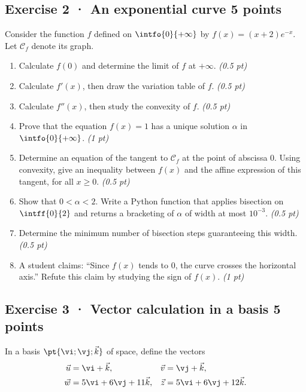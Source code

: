 \subsection*{Exercise 2 · An exponential curve \hfill 5 points}Consider the function $f$ defined on $\intfo{0}{+\infty}$ by $f(x)=(x+2)e^{-x}$. Let $\mathcal C_f$ denote its graph.

\begin{enumerate}

\item Calculate $f(0)$ and determine the limit of $f$ at $+\infty$. \hfill\textit{(0.5 pt)}

\item Calculate $f' (x)$, then draw the variation table of $f$. \hfill\textit{(0.5 pt)}

\item Calculate $f'' (x)$, then study the convexity of $f$. \hfill\textit{(0.5 pt)}

\item Prove that the equation $f(x)=1$ has a unique solution $\alpha$ in $\intfo{0}{+\infty}$. \hfill\textit{(1 pt)}

\item Determine an equation of the tangent to $\mathcal C_f$ at the point of abscissa $0$. Using convexity, give an inequality between $f(x)$ and the affine expression of this tangent, for all $x\ge0$. \hfill\textit{(0.5 pt)}

\item Show that $0<\alpha<2$. Write a Python function that applies bisection on $\intff{0}{2}$ and returns a bracketing of $\alpha$ of width at most $10^{-3}$. \hfill\textit{(0.5 pt)}

\item Determine the minimum number of bisection steps guaranteeing this width. \hfill\textit{(0.5 pt)}

\item A student claims: ``Since $f(x)$ tends to $0$, the curve crosses the horizontal axis.'' Refute this claim by studying the sign of $f(x)$. \hfill\textit{(1 pt)}

\end{enumerate}

\mxnewpage{}

\subsection*{Exercise 3 · Vector calculation in a basis \hfill 5 points}In a basis $\pt{\vi;\vj;\vec k}$ of space, define the vectors
\[\begin{aligned}\vec u&=\vi+\vec k,&\vec v&=\vj+\vec k,\\
\vec w&=5\vi+6\vj+11\vec k,&\vec z&=5\vi+6\vj+12\vec k.\end{aligned}\]

